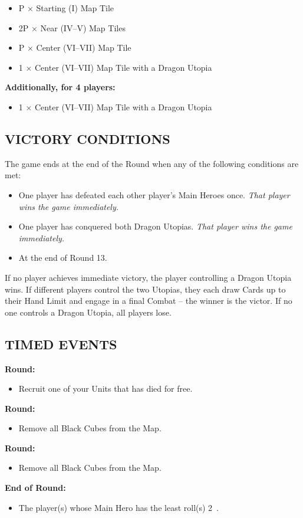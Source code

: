 \begin{multicols*}{2}
\begin{itemize}
  \item P × Starting (I) Map Tile
  \item 2P × Near (IV–V) Map Tiles
  \item P × Center (VI–VII) Map Tile
  \item 1 × Center (VI–VII) Map Tile with a Dragon Utopia
\end{itemize}

\columnbreak
\textbf{Additionally, for 4 players:}
\begin{itemize}
  \item 1 × Center (VI–VII) Map Tile with a Dragon Utopia
\end{itemize}

\subsection*{\MakeUppercase{Victory Conditions}}
The game ends at the end of the Round when any of the following conditions are met:

\begin{itemize}
 \item One player has defeated each other player's Main Heroes once. \textit{That player wins the game immediately.}
 \item One player has conquered both Dragon Utopias. \textit{That player wins the game immediately.}
 \item At the end of Round 13.
\end{itemize}

If no player achieves immediate victory, the player controlling a Dragon Utopia wins.
If different players control the two Utopias, they each draw Cards up to their Hand Limit and engage in a final Combat -- the winner is the victor.
If no one controls a Dragon Utopia, all players lose.
\subsection*{\MakeUppercase{Timed Events}}

\textbf{ Round:}
\begin{itemize}
  \item Recruit one of your Units that has died for free.
\end{itemize}
\textbf{ Round:}
\begin{itemize}
  \item Remove all Black Cubes from the Map.
\end{itemize}
\textbf{ Round:}
\begin{itemize}
  \item Remove all Black Cubes from the Map.
\end{itemize}
\textbf{End of  Round:}
\begin{itemize}
  \item The player(s) whose Main Hero has the least  roll(s) 2~.
\end{itemize}


\end{multicols*}
